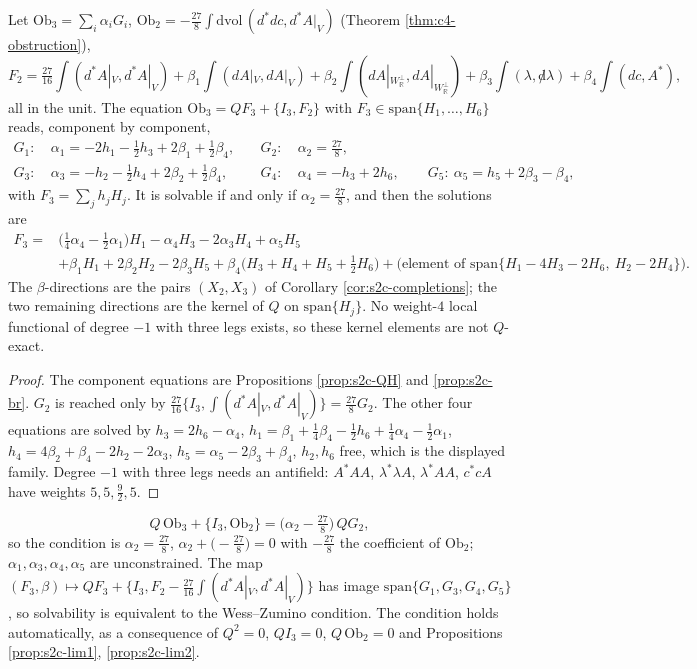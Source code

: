 \begin{theorem}[Solution]
\label{thm:s2c-solve}
Let $\mathrm{Ob}_3=\sum_i\alpha_iG_i$, $\mathrm{Ob}_2=-\tfrac{27}8\int\mathrm{dvol}\,(d^*dc,d^*A|_V)$ (Theorem \ref{thm:c4-obstruction}),
\[
F_2=\tfrac{27}{16}\int(d^*A|_V,d^*A|_V)+\beta_1\int(dA|_V,dA|_V)+\beta_2\int(dA|_{W_{\mathbb R}^\perp},dA|_{W_{\mathbb R}^\perp})+\beta_3\int(\lambda,{\not d}\lambda)+\beta_4\int(dc,A^*),
\]
all in the unit. The equation $\mathrm{Ob}_3=QF_3+\{I_3,F_2\}$ with $F_3\in\mathrm{span}\{H_1,\dots,H_6\}$ reads, component by component,
\[
\begin{aligned}
G_1:&\ \alpha_1=-2h_1-\tfrac12h_3+2\beta_1+\tfrac12\beta_4, &\quad G_2:&\ \alpha_2=\tfrac{27}{8},\\
G_3:&\ \alpha_3=-h_2-\tfrac12h_4+2\beta_2+\tfrac12\beta_4, &\quad G_4:&\ \alpha_4=-h_3+2h_6,\qquad G_5:\ \alpha_5=h_5+2\beta_3-\beta_4,
\end{aligned}
\]
with $F_3=\sum_jh_jH_j$. It is solvable if and only if $\alpha_2=\tfrac{27}8$, and then the solutions are
\[
\begin{aligned}
F_3={}&\big(\tfrac14\alpha_4-\tfrac12\alpha_1\big)H_1-\alpha_4H_3-2\alpha_3H_4+\alpha_5H_5\\
&+\beta_1H_1+2\beta_2H_2-2\beta_3H_5+\beta_4\big(H_3+H_4+H_5+\tfrac12H_6\big)+\big(\text{element of }\mathrm{span}\{H_1-4H_3-2H_6,\ H_2-2H_4\}\big).
\end{aligned}
\]
The $\beta$-directions are the pairs $(X_2,X_3)$ of Corollary \ref{cor:s2c-completions}; the two remaining directions are the kernel of $Q$ on $\mathrm{span}\{H_j\}$. No weight-$4$ local functional of degree $-1$ with three legs exists, so these kernel elements are not $Q$-exact.
\end{theorem}

\begin{proof}
The component equations are Propositions \ref{prop:s2c-QH} and \ref{prop:s2c-br}. $G_2$ is reached only by $\tfrac{27}{16}\{I_3,\int(d^*A|_V,d^*A|_V)\}=\tfrac{27}8G_2$. The other four equations are solved by $h_3=2h_6-\alpha_4$, $h_1=\beta_1+\tfrac14\beta_4-\tfrac12h_6+\tfrac14\alpha_4-\tfrac12\alpha_1$, $h_4=4\beta_2+\beta_4-2h_2-2\alpha_3$, $h_5=\alpha_5-2\beta_3+\beta_4$, $h_2,h_6$ free, which is the displayed family. Degree $-1$ with three legs needs an antifield: $A^*AA$, $\lambda^*\lambda A$, $\lambda^*AA$, $c^*cA$ have weights $5,5,\tfrac92,5$.
\end{proof}

\begin{theorem}
\label{thm:s2c-wz}
\[
Q\,\mathrm{Ob}_3+\{I_3,\mathrm{Ob}_2\}=\big(\alpha_2-\tfrac{27}8\big)\,QG_2 ,
\]
so the condition is $\alpha_2=\tfrac{27}8$, $\alpha_2+\big(-\tfrac{27}8\big)=0$ with $-\tfrac{27}8$ the coefficient of $\mathrm{Ob}_2$; $\alpha_1,\alpha_3,\alpha_4,\alpha_5$ are unconstrained. The map $(F_3,\beta)\mapsto QF_3+\{I_3,F_2-\tfrac{27}{16}\int(d^*A|_V,d^*A|_V)\}$ has image $\mathrm{span}\{G_1,G_3,G_4,G_5\}$, so solvability is equivalent to the Wess--Zumino condition. The condition holds automatically, as a consequence of $Q^2=0$, $QI_3=0$, $Q\,\mathrm{Ob}_2=0$ and Propositions \ref{prop:s2c-lim1}, \ref{prop:s2c-lim2}.
\end{theorem}

